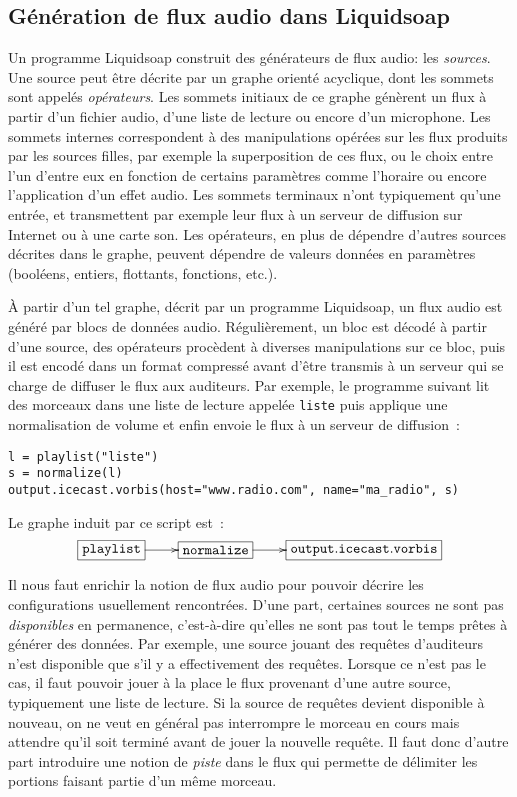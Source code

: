 \documentclass[twoside]{article}
\newcommand{\liquidsoap}{Liquidsoap}
\theoremstyle{plain}
\theoremstyle{definition}
\theoremstyle{remark}
\begin{document}
\subsection{Génération de flux audio dans \liquidsoap}

Un programme \liquidsoap{} construit des générateurs de flux audio: les 
\emph{sources}. Une source peut être décrite par un graphe orienté acyclique,
dont les sommets sont appelés \emph{opérateurs}.
Les sommets initiaux de ce graphe
génèrent un flux à partir d'un fichier audio, d'une liste de lecture ou 
encore d'un microphone.
Les sommets internes correspondent à des manipulations opérées sur les flux
produits par les sources filles, par exemple la superposition de ces flux, ou
le choix entre l'un d'entre eux en fonction de certains paramètres comme l'horaire ou
encore l'application d'un effet audio.
Les sommets terminaux n'ont typiquement qu'une entrée, et transmettent par 
exemple leur flux à un serveur de diffusion sur Internet ou à une carte son.
Les opérateurs, en plus de dépendre d'autres
sources décrites dans le graphe, peuvent dépendre de valeurs données en
paramètres (booléens, entiers, flottants, fonctions, etc.).

À partir d'un tel graphe, décrit par un programme \liquidsoap{}, un flux audio
est généré par blocs de données audio. Régulièrement, un bloc est décodé à
partir d'une source, des opérateurs procèdent à diverses manipulations sur ce bloc,
puis il est encodé dans un format compressé avant d'être transmis à un serveur
qui se charge de diffuser le flux aux auditeurs.
Par exemple, le programme
suivant lit des morceaux dans une liste de lecture appelée \texttt{liste} puis
applique une normalisation de volume et enfin envoie le flux à un serveur de
diffusion~:
\begin{verbatim}
l = playlist("liste")
s = normalize(l)
output.icecast.vorbis(host="www.radio.com", name="ma_radio", s)
\end{verbatim}
Le graphe induit par ce script est~:
\[
\xymatrix{
  *+[F]{\mathtt{playlist}}\ar[r]&
  *+[F]{\mathtt{normalize}}\ar[r]&
  *+[F]{\mathtt{output.icecast.vorbis}}\\
}
\]

Il nous faut enrichir la notion de flux audio pour pouvoir décrire
les configurations usuellement rencontrées.
D'une part, certaines sources ne sont pas \emph{disponibles} en permanence,
c'est-à-dire qu'elles ne sont pas tout le temps prêtes à générer des données.
Par exemple, une source jouant des requêtes d'auditeurs n'est disponible
que s'il y a effectivement des requêtes. Lorsque ce n'est pas le cas, il
faut pouvoir jouer à la place le flux provenant d'une autre source, typiquement
une liste de lecture. Si la source de requêtes devient disponible à nouveau, on
ne veut en général pas interrompre le morceau en cours mais attendre qu'il soit
terminé avant de jouer la nouvelle requête. Il faut donc d'autre part introduire une
notion de \emph{piste} dans le flux qui permette de délimiter les portions
faisant partie d'un même morceau.
\end{document}
